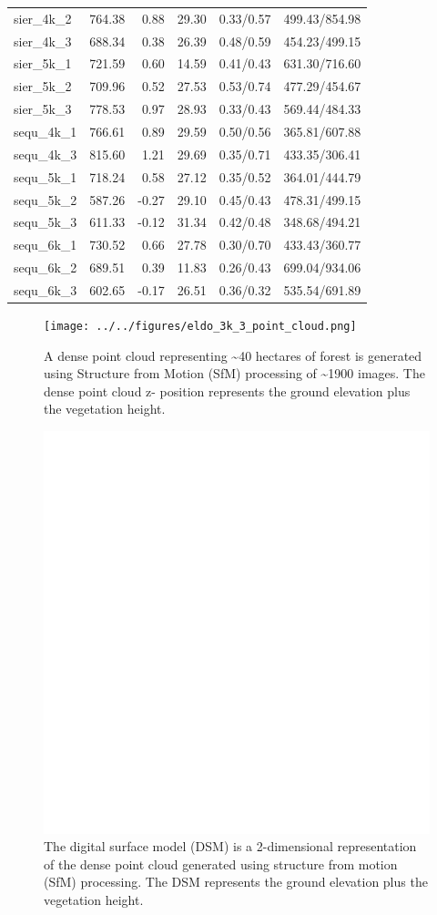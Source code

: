 \documentclass[]{article}
\begin{document}
\begin{longtable}[]{@{}lrrrll@{}}
sier\_4k\_2 & 764.38 & 0.88 & 29.30 & 0.33/0.57 &
499.43/854.98\tabularnewline
sier\_4k\_3 & 688.34 & 0.38 & 26.39 & 0.48/0.59 &
454.23/499.15\tabularnewline
sier\_5k\_1 & 721.59 & 0.60 & 14.59 & 0.41/0.43 &
631.30/716.60\tabularnewline
sier\_5k\_2 & 709.96 & 0.52 & 27.53 & 0.53/0.74 &
477.29/454.67\tabularnewline
sier\_5k\_3 & 778.53 & 0.97 & 28.93 & 0.33/0.43 &
569.44/484.33\tabularnewline
sequ\_4k\_1 & 766.61 & 0.89 & 29.59 & 0.50/0.56 &
365.81/607.88\tabularnewline
sequ\_4k\_3 & 815.60 & 1.21 & 29.69 & 0.35/0.71 &
433.35/306.41\tabularnewline
sequ\_5k\_1 & 718.24 & 0.58 & 27.12 & 0.35/0.52 &
364.01/444.79\tabularnewline
sequ\_5k\_2 & 587.26 & -0.27 & 29.10 & 0.45/0.43 &
478.31/499.15\tabularnewline
sequ\_5k\_3 & 611.33 & -0.12 & 31.34 & 0.42/0.48 &
348.68/494.21\tabularnewline
sequ\_6k\_1 & 730.52 & 0.66 & 27.78 & 0.30/0.70 &
433.43/360.77\tabularnewline
sequ\_6k\_2 & 689.51 & 0.39 & 11.83 & 0.26/0.43 &
699.04/934.06\tabularnewline
sequ\_6k\_3 & 602.65 & -0.17 & 26.51 & 0.36/0.32 &
535.54/691.89\tabularnewline
\bottomrule
\end{longtable}

\begin{figure}
\centering
\texttt{[image: ../../figures/eldo\_3k\_3\_point\_cloud.png]}
\caption{A dense point cloud representing \textasciitilde{}40 hectares
of forest is generated using Structure from Motion (SfM) processing of
\textasciitilde{}1900 images. The dense point cloud z- position
represents the ground elevation plus the vegetation height.}
\end{figure}

\begin{figure}
\centering
\includegraphics{../../figures/eldo_3k_3_dsm.png}
\caption{The digital surface model (DSM) is a 2-dimensional
representation of the dense point cloud generated using structure from
motion (SfM) processing. The DSM represents the ground elevation plus
the vegetation height.}
\end{figure}
\end{document}

